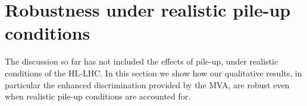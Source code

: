 
\section{Robustness under realistic pile-up conditions}

\label{sec:pileup}

The discussion so far has not included the effects of
pile-up, under realistic conditions of the HL-LHC.
%
In this section we show how our qualitative results, in particular
the enhanced discrimination provided by the MVA, are robust
even when realistic pile-up conditions are accounted for.
